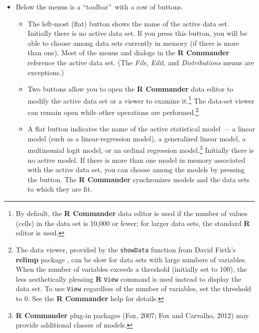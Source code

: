 \documentclass{article}%
\begin{document}
\begin{itemize}
\item Below the menus is a \textquotedblleft toolbar\textquotedblright\ with a
row of buttons.

\begin{itemize}
\item The left-most (flat) button shows the name of the active data set.
Initially there is no active data set. If you press this button, you will be
able to choose among data sets currently in memory (if there is more than
one). Most of the menus and dialogs in the \textbf{R Commander} reference the
active data set. (The \emph{File}, \emph{Edit}, and \emph{Distributions} menus
are exceptions.)

\item Two buttons allow you to open the \textbf{R Commander} data editor to modify the
active data set or a viewer to examine it.\footnote{By default, the \textbf{R Commander} data editor
is used if the number of values (cells) in the data set is 10,000 or fewer; for larger data sets,
the standard \textbf{R} editor is used.} The data-set viewer can remain open
while other operations are performed.\footnote{The data viewer, provided by
the \texttt{showData} function from David Firth's \textbf{relimp}
package \citep{Firth11}, can be slow for data sets with large numbers of
variables. When the number of variables exceeds a threshold (initially set to
100), the less aesthetically pleasing \textbf{R} \texttt{View} command is used
instead to display the data set. To use \texttt{View} regardless of the number
of variables, set the threshold to 0. See the \textbf{R Commander} help for
details.}

\item A flat button indicates the name of the active statistical model --- a
linear model (such as a linear-regression model), a generalized linear model,
a multinomial logit model, or an ordinal regression model.\footnote{\textbf{R
Commander} plug-in packages (Fox, 2007; Fox and Carvalho, 2012) may provide
additional classes of models.} Initially there is no active model. If there is
more than one model in memory associated with the active data set, you can
choose among the models by pressing the button. The \textbf{R Commander}
synchronizes models and the data sets to which they are fit.
\end{itemize}


\end{itemize}
\end{document}
